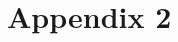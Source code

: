 \documentclass[fleqn, usenatbib]{mnras}
\begin{document}



\section{Appendix 2}

\bsp	%
\label{lastpage}
\end{document}
